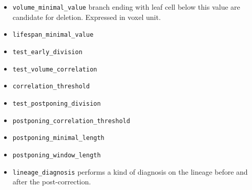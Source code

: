 \begin{itemize}
\itemsep -0.5ex
\item \texttt{volume\_minimal\_value}
  branch ending with leaf cell below this value are candidate for deletion. Expressed in voxel unit.
\item \texttt{lifespan\_minimal\_value}
\item \texttt{test\_early\_division}
\item \texttt{test\_volume\_correlation}
\item \texttt{correlation\_threshold}
\item \texttt{test\_postponing\_division}
\item \texttt{postponing\_correlation\_threshold}
\item \texttt{postponing\_minimal\_length}
\item \texttt{postponing\_window\_length}
\item \texttt{lineage\_diagnosis}
  performs a kind of diagnosis on the lineage before and after the post-correction.
\end{itemize}





